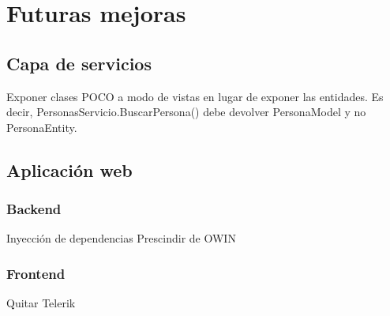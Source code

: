 \chapter{Futuras mejoras}

\section{Capa de servicios}
Exponer clases POCO a modo de vistas en lugar de exponer las entidades. Es decir, PersonasServicio.BuscarPersona() debe devolver PersonaModel y no PersonaEntity.

\section{Aplicación web}

\subsection{Backend}
Inyección de dependencias
Prescindir de OWIN

\subsection{Frontend}
Quitar Telerik